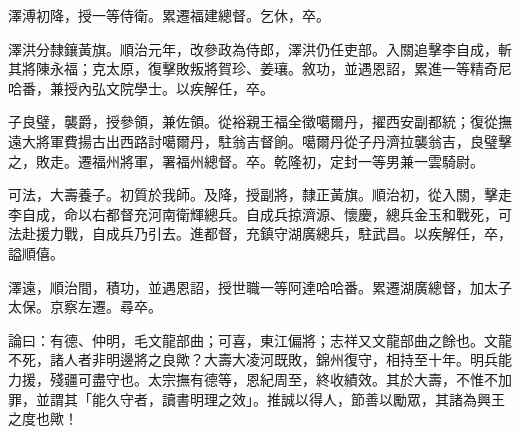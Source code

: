 \begin{pinyinscope}
澤溥初降，授一等侍衛。累遷福建總督。乞休，卒。

澤洪分隸鑲黃旗。順治元年，改參政為侍郎，澤洪仍任吏部。入關追擊李自成，斬其將陳永福；克太原，復擊敗叛將賀珍、姜瓖。敘功，並遇恩詔，累進一等精奇尼哈番，兼授內弘文院學士。以疾解任，卒。

子良璧，襲爵，授參領，兼佐領。從裕親王福全徵噶爾丹，擢西安副都統；復從撫遠大將軍費揚古出西路討噶爾丹，駐翁吉督餉。噶爾丹從子丹濟拉襲翁吉，良璧擊之，敗走。遷福州將軍，署福州總督。卒。乾隆初，定封一等男兼一雲騎尉。

可法，大壽養子。初質於我師。及降，授副將，隸正黃旗。順治初，從入關，擊走李自成，命以右都督充河南衛輝總兵。自成兵掠濟源、懷慶，總兵金玉和戰死，可法赴援力戰，自成兵乃引去。進都督，充鎮守湖廣總兵，駐武昌。以疾解任，卒，謚順僖。

澤遠，順治間，積功，並遇恩詔，授世職一等阿達哈哈番。累遷湖廣總督，加太子太保。京察左遷。尋卒。

論曰：有德、仲明，毛文龍部曲；可喜，東江偏將；志祥又文龍部曲之餘也。文龍不死，諸人者非明邊將之良歟？大壽大凌河既敗，錦州復守，相持至十年。明兵能力援，殘疆可盡守也。太宗撫有德等，恩紀周至，終收績效。其於大壽，不惟不加罪，並謂其「能久守者，讀書明理之效」。推誠以得人，節善以勵眾，其諸為興王之度也歟！


\end{pinyinscope}